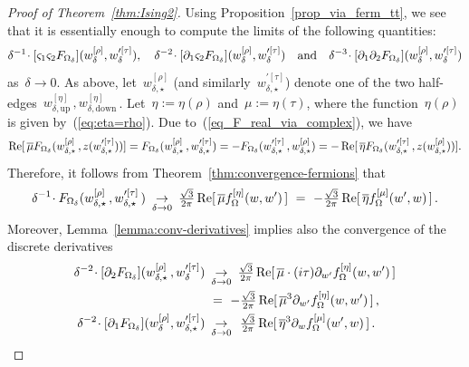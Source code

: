\documentclass[reqno,11pt,a4paper]{amsart}
\theoremstyle{remark}
\newcommand{\weta}{w^{\left[\eta \right]}}
\newcommand{\wrho}{w^{\left[\rho \right]}}
\newcommand{\wpmu}{w^{\prime[\mu]}}
\newcommand{\wptau}{w^{\prime[\tau]}}                   %
\newcommand{\feta}{f_{\Omega}^{[\eta]}}
\newcommand{\fmu}{f_{\Omega}^{[\mu]}}
\newcommand{\dOne}{\partial_1}
\newcommand{\dTwo}{\partial_2}
\newcommand{\sOne}{\varsigma_1}
\newcommand{\sTwo}{\varsigma_2}
\renewcommand\Re{\operatorname{Re}}
\begin{document}
\begin{proof}[Proof of Theorem~\ref{thm:Ising2}]
Using Proposition~\ref{prop_via_ferm_tt}, we see that it is essentially enough to compute the limits of the following quantities:
\[
\delta^{-1}\!\cdot[\sOne\sTwo\Fdelta](\wrho_\delta,\wptau_\delta),\quad \delta^{-2}\!\cdot[\dOne\sTwo\Fdelta](\wrho_\delta,\wptau_\delta)\quad \text{and}\quad \delta^{-3}\!\cdot[\dOne\dTwo\Fdelta](\wrho_\delta,\wptau_\delta)
\]
as~$\delta\to 0$. As above, let~$\wrho_{\delta,\star}$ (and similarly~$\wptau_{\delta,\star}$) denote one of the two half-edges~$\weta_{\delta,\mathrm{up}}\,,\weta_{\delta,\mathrm{down}}$\,. Let~$\eta:=\eta(\rho)$ and~$\mu:=\eta(\tau)$, where the function~$\eta(\rho)$ is given by~(\ref{eq:eta=rho}).
Due to~(\ref{eq_F_real_via_complex}),
we have
\[
\Re[\,\overline{\mu}\Fdelta(\wrho_{\delta,\star}\,,z(\wptau_{\delta,\star}))] = \Fdelta(\wrho_{\delta,\star}\,,\wptau_{\delta,\star})  =  -\Fdelta(\wptau_{\delta,\star}\,,\wrho_{\delta,\star}) = -\Re[\,\overline{\eta}\Fdelta(\wptau_{\delta,\star}\,,z(\wrho_{\delta,\star}))].
\]
Therefore, it follows from Theorem~\ref{thm:convergence-fermions} that
\begin{equation}
\label{eq_x_conv_TT_ss}
\delta^{-1}\!\cdot\Fdelta(\wrho_{\delta,\star}\,,\wptau_{\delta,\star}\,)\ \mathop{\to}_{\delta\to 0}\ \tfrac{\sqrt{3}}{2\pi}\Re[\,\overline{\mu}\feta(w,w')\,] ~=~ -\tfrac{\sqrt{3}}{2\pi}\Re[\,\overline{\eta}\fmu(w',w)\,]\,.
\end{equation}
Moreover, %
Lemma~\ref{lemma:conv-derivatives} implies also the convergence of the discrete derivatives
\begin{align}
\notag 
\delta^{-2}\!\cdot[\dTwo\Fdelta](\wrho_{\delta,\star}\,,\wptau_\delta)\ &\mathop{\to}_{\delta\to 0}\ \tfrac{\sqrt{3}}{2\pi}\Re[\,\overline{\mu}\cdot (i\tau)\partial_{w'}\feta(w,w')\,] \\
&=~-\tfrac{\sqrt{3}}{2\pi}\Re[\,\overline{\mu}^3\partial_{w'}\feta(w,w')\,]\,,
\label{eq_x_conv_TT_sd}\\
\delta^{-2}\!\cdot[\dOne\Fdelta](\wrho_\delta,\wptau_{\delta,\star})\ &\mathop{\to}_{\delta\to 0}\ \,\tfrac{\sqrt{3}}{2\pi}\Re[\,\overline{\eta}^3\partial_{w}\fmu(w',w)\,]\,.
\label{eq_x_conv_TT_ds}
\end{align}


\end{proof}
\end{document}
